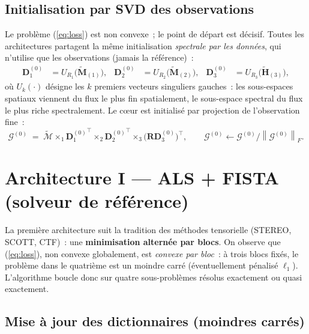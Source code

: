 \documentclass[11pt,a4paper]{article}
\newcommand{\T}[1]{\bm{\mathcal{#1}}}          %
\newcommand{\M}[1]{\bm{#1}}                     %
\newcommand{\norf}[1]{\left\lVert #1 \right\rVert_F}
\newcommand{\unfold}[2]{\M{#1}_{(#2)}}
\begin{document}
\subsection{Initialisation par SVD des observations}
\label{sec:init}

Le problème (\ref{eq:loss}) est non convexe~; le point de départ est décisif.
Toutes les architectures partagent la même initialisation \emph{spectrale
par les données}, qui n'utilise que les observations (jamais la référence)~:
\begin{align}
  \M{D}_1^{(0)} &= U_{R_1}\!\bigl(\unfold{\widetilde{M}}{1}\bigr), &
  \M{D}_2^{(0)} &= U_{R_2}\!\bigl(\unfold{\widetilde{M}}{2}\bigr), &
  \M{D}_3^{(0)} &= U_{R_3}\!\bigl(\unfold{\widetilde{H}}{3}\bigr),
  \label{eq:init-svd}
\end{align}
où $U_k(\cdot)$ désigne les $k$ premiers vecteurs singuliers gauches~: les
sous-espaces spatiaux viennent du flux le plus fin spatialement, le
sous-espace spectral du flux le plus riche spectralement. Le c\oe ur est
initialisé par projection de l'observation fine~:
\begin{equation}
  \T{G}^{(0)} \;=\;
  \widetilde{\T{M}}\times_1{\M{D}_1^{(0)}}^{\!\top}
  \times_2{\M{D}_2^{(0)}}^{\!\top}
  \times_3\bigl(\M{R}\M{D}_3^{(0)}\bigr)^{\!\top},
  \qquad
  \T{G}^{(0)} \leftarrow \T{G}^{(0)}/\norf{\T{G}^{(0)}}.
  \label{eq:init-core}
\end{equation}

\section{Architecture I --- ALS + FISTA (solveur de référence)}
\label{sec:als}

La première architecture suit la tradition des méthodes tensorielle (STEREO,
SCOTT, CTF)~: une \textbf{minimisation alternée par blocs}. On observe que
(\ref{eq:loss}), non convexe globalement, est \emph{convexe par bloc}~: à
trois blocs fixés, le problème dans le quatrième est un moindre carré
(éventuellement pénalisé $\ell_1$). L'algorithme boucle donc sur quatre
sous-problèmes résolus exactement ou quasi exactement.

\subsection{Mise à jour des dictionnaires (moindres carrés)}
\end{document}
